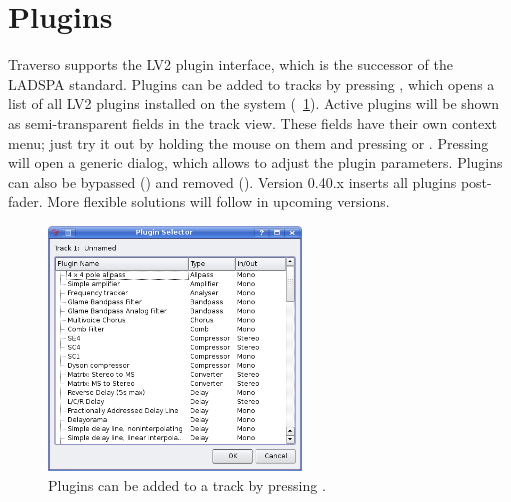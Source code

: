 \section{Plugins}
Traverso supports the LV2 plugin interface, which is the successor of the LADSPA standard. Plugins can be added to tracks by pressing , which opens a list of all LV2 plugins installed on the system (\FigB~\ref{fig_pluglist}). Active plugins will be shown as semi-transparent fields in the track view. These fields have their own context menu; just try it out by holding the mouse on them and pressing  or . Pressing  will open a generic dialog, which allows to adjust the plugin parameters. Plugins can also be bypassed () and removed (). Version 0.40.x inserts all plugins post-fader. More flexible solutions will follow in upcoming versions.

\begin{figure}[t]
 \centering\includegraphics[width=0.6\textwidth]{../images/plugin-list}
 \caption{Plugins can be added to a track by pressing .}
 \label{fig_pluglist}
\end{figure}


